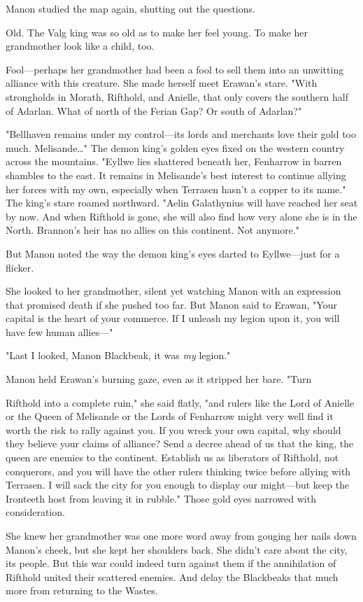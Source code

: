 Manon studied the map again, shutting out the questions.

Old. The Valg king was so old as to make her feel young. To make her grandmother look like a child, too.

Fool---perhaps her grandmother had been a fool to sell them into an unwitting alliance with this creature. She made herself meet Erawan's stare. "With strongholds in Morath, Rifthold, and Anielle, that only covers the southern half of Adarlan. What of north of the Ferian Gap? Or south of Adarlan?"

"Bellhaven remains under my control---its lords and merchants love their gold too much. Melisande\ldots" The demon king's golden eyes fixed on the western country across the mountains. "Eyllwe lies shattered beneath her, Fenharrow in barren shambles to the east. It remains in Melisande's best interest to continue allying her forces with my own, especially when Terrasen hasn't a copper to its name." The king's stare roamed northward. "Aelin Galathynius will have reached her seat by now. And when Rifthold is gone, she will also find how very alone she is in the North. Brannon's heir has no allies on this continent. Not anymore."

But Manon noted the way the demon king's eyes darted to Eyllwe---just for a flicker.

She looked to her grandmother, silent yet watching Manon with an expression that promised death if she pushed too far. But Manon said to Erawan, "Your capital is the heart of your commerce. If I unleash my legion upon it, you will have few human allies---"

"Last I looked, Manon Blackbeak, it was \emph{my} legion."

Manon held Erawan's burning gaze, even as it stripped her bare. "Turn

Rifthold into a complete ruin," she said flatly, "and rulers like the Lord of Anielle or the Queen of Melisande or the Lords of Fenharrow might very well find it worth the risk to rally against you. If you wreck your own capital, why should they believe your claims of alliance? Send a decree ahead of us that the king, the queen are enemies to the continent. Establish us as liberators of Rifthold, not conquerors, and you will have the other rulers thinking twice before allying with Terrasen. I will sack the city for you enough to display our might---but keep the Ironteeth host from leaving it in rubble." Those gold eyes narrowed with consideration.

She knew her grandmother was one more word away from gouging her nails down Manon's cheek, but she kept her shoulders back. She didn't care about the city, its people. But this war could indeed turn against them if the annihilation of Rifthold united their scattered enemies. And delay the Blackbeaks that much more from returning to the Wastes.

